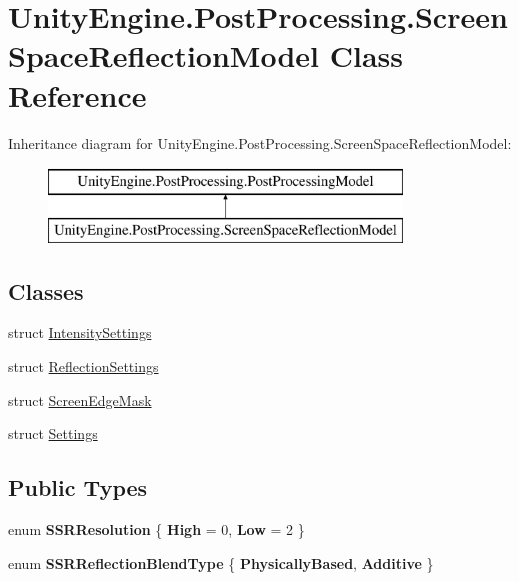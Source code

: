 \hypertarget{class_unity_engine_1_1_post_processing_1_1_screen_space_reflection_model}{}\section{Unity\+Engine.\+Post\+Processing.\+Screen\+Space\+Reflection\+Model Class Reference}
\label{class_unity_engine_1_1_post_processing_1_1_screen_space_reflection_model}
Inheritance diagram for Unity\+Engine.\+Post\+Processing.\+Screen\+Space\+Reflection\+Model\+:\begin{figure}[H]
\begin{center}
\leavevmode
\includegraphics[height=2.000000cm]{class_unity_engine_1_1_post_processing_1_1_screen_space_reflection_model}
\end{center}
\end{figure}
\subsection*{Classes}
\begin{DoxyCompactItemize}
\item 
struct \hyperlink{struct_unity_engine_1_1_post_processing_1_1_screen_space_reflection_model_1_1_intensity_settings}{Intensity\+Settings}
\item 
struct \hyperlink{struct_unity_engine_1_1_post_processing_1_1_screen_space_reflection_model_1_1_reflection_settings}{Reflection\+Settings}
\item 
struct \hyperlink{struct_unity_engine_1_1_post_processing_1_1_screen_space_reflection_model_1_1_screen_edge_mask}{Screen\+Edge\+Mask}
\item 
struct \hyperlink{struct_unity_engine_1_1_post_processing_1_1_screen_space_reflection_model_1_1_settings}{Settings}
\end{DoxyCompactItemize}
\subsection*{Public Types}
\begin{DoxyCompactItemize}
\item 
\mbox{\label{class_unity_engine_1_1_post_processing_1_1_screen_space_reflection_model_acbe36890d4b8ede4152e13108af7ba1f}} 
enum {\bfseries S\+S\+R\+Resolution} \{ {\bfseries High} = 0, 
{\bfseries Low} = 2
 \}
\item 
\mbox{\label{class_unity_engine_1_1_post_processing_1_1_screen_space_reflection_model_acb7310312d36f7cf7cf72d923ee5271b}} 
enum {\bfseries S\+S\+R\+Reflection\+Blend\+Type} \{ {\bfseries Physically\+Based}, 
{\bfseries Additive}
 \}
\end{DoxyCompactItemize}
